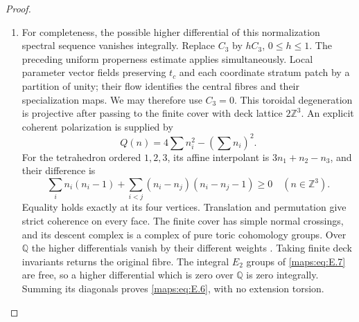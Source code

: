 \begin{proof}
\begin{enumerate}[label=\arabic*.,leftmargin=*]
\item For completeness, the possible higher differential of this
normalization spectral sequence vanishes integrally.  Replace $C_3$
by $hC_3$, $0\leq h\leq1$.  The preceding uniform properness estimate
applies simultaneously.  Local parameter vector fields preserving
$t_c$ and each coordinate stratum patch by a partition of unity;
their flow identifies the central fibres and their specialization
maps.  We may therefore use $C_3=0$.  This toroidal degeneration is
projective after passing to the finite cover with deck lattice
$2\mathbb Z^3$.  An explicit coherent polarization is supplied by
\[
 Q(n)=4\sum n_i^2-(\sum n_i)^2.
\]
For the tetrahedron ordered $1,2,3$, its affine interpolant is
$3n_1+n_2-n_3$, and their difference is
\[
 \sum_i n_i(n_i-1)+
 \sum_{i<j}(n_i-n_j)(n_i-n_j-1)\geq0
 \quad(n\in\mathbb Z^3).
\]
Equality holds exactly at its four vertices.  Translation and
permutation give strict coherence on every face.  The finite cover
has simple normal crossings, and its descent complex is a complex
of pure toric cohomology groups.  Over $\mathbb Q$ the higher
differentials vanish by their different weights \cite[Proposition~8.3.5, pp.~42--43]{mapsDeligne1974HodgeIII}.  Taking finite
deck invariants returns the original fibre.  The integral $E_2$
groups of \eqref{maps:eq:E.7} are free, so a higher differential which is zero
over $\mathbb Q$ is zero integrally.  Summing its diagonals proves
\eqref{maps:eq:E.6}, with no extension torsion.


\end{enumerate}
\end{proof}
